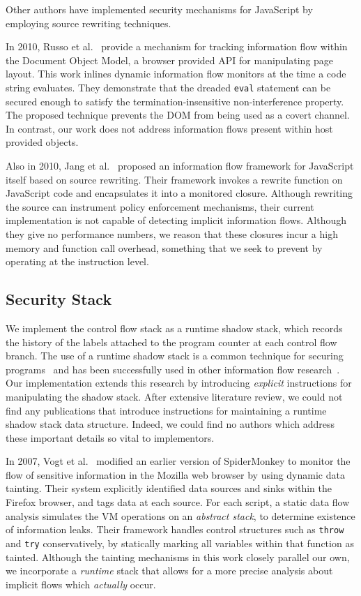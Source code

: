 Other authors have implemented security mechanisms for JavaScript by employing source rewriting techniques.

In 2010, Russo et al.~\cite{1813092} provide a mechanism for tracking information flow within the Document Object Model, a browser provided API for manipulating page layout.
This work inlines dynamic information flow monitors at the time a code string evaluates.
They demonstrate that the dreaded \texttt{eval} statement can be secured enough to satisfy the termination-insensitive non-interference property.
The proposed technique prevents the DOM from being used as a covert channel.
In contrast, our work does not address information flows present within host provided objects.

Also in 2010, Jang et al.~\cite{1866339} proposed an information flow framework for JavaScript itself based on source rewriting.
Their framework invokes a rewrite function on JavaScript code and encapsulates it into a monitored closure.
Although rewriting the source can instrument policy enforcement mechanisms, their current implementation is not capable of detecting implicit information flows.
Although they give no performance numbers, we reason that these closures incur a high memory and function call overhead, something that we seek to prevent by operating at the instruction level.

\subsection{Security Stack}
\label{sec:relatedwork-security-stack}

We implement the control flow stack as a runtime shadow stack, which records the history of the labels attached to the program counter at each control flow branch.
The use of a runtime shadow stack is a common technique for securing programs~\cite{abadi2009control, frantzen2001stackghost, prasad2003binary} and has been successfully used in other information flow research~\cite{lam2006general}.
Our implementation extends this research by introducing \emph{explicit} instructions for manipulating the shadow stack.
After extensive literature review, we could not find any publications that introduce instructions for maintaining a runtime shadow stack data structure.
Indeed, we could find no authors which address these important details so vital to implementors.

In 2007, Vogt et al.~\cite{Vogt_CrossSiteScripting_2007} modified an earlier version of SpiderMonkey to monitor the flow of sensitive information in the Mozilla web browser by using dynamic data tainting.
Their system explicitly identified data sources and sinks within the Firefox browser, and tags data at each source.
For each script, a static data flow analysis simulates the VM operations on an \emph{abstract stack}, to determine existence of information leaks.
Their framework handles control structures such as \texttt{throw} and \texttt{try} conservatively, by statically marking all variables within that function as tainted.
Although the tainting mechanisms in this work closely parallel our own, we incorporate a \emph{runtime} stack that allows for a more precise analysis about implicit flows which \emph{actually} occur.

